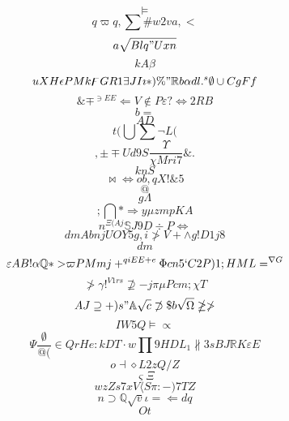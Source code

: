 \documentclass[12pt]{article}
\begin{document}
        \begin{minipage}[t][0pt]{\linewidth}

        \[\models\]
\[q\varpi q ,\sum\# w 2 v a , <\]
\[a\sqrt{Blq"Uxn}\]
\[kA\beta\]
\[uXH\epsilon P M k\digamma G R 1\exists J I\imath * )\% "\mathbb{R} b\alpha d l .^{s}\emptyset\cup C g F f\]
\[\&\mp^{\ni E E}\Longleftarrow V\notin P\varepsilon ?\iff 2 R B\]
\[b=\]
\[AD\]
\[t(\bigcup\sum\neg L (\]
\[,\pm\mp U d 9 S\frac{\Upsilon}{\chi M r i 7}\& .\]
\[kn {S}\]
\[\bowtie\iff o b , q X !\& 5\]
\[@\]
\[g\Lambda\]
\[;\bigcap *\Longrightarrow y\mu z m p K A\]
\[n^{\Xi ( A j}\mathbb{S} J 9 D\div P\Leftrightarrow\]
\[dmAbnjUOY5g,i\ngtr V +\land g ! D 1 j 8\]
\[dm\]
\[\varepsilon A B !\alpha {\mathbb{Q} * >}\varpi P M m j +^{qiEE+e}\Phi c n 5 ` C 2 P ) 1 ; H M L =^{\nabla G}\]
\[\ngtr\gamma !^{V1rs}\nsupseteq - {j}\pi\mu P {cm;}\chi T\]
\[AJ\supseteq + ) s "\mathbb{A}\sqrt{c}\not\supset\$ b\sqrt{\Omega}\ngeq\ngtr\]
\[IW5Q\models\propto\]
\[\Psi\frac{\emptyset}{ @ (}\in Q r H e : k D T\cdot w\prod 9 H D L_{1}\nparallel 3 s B J\mathbb{R} K\varepsilon E\]
\[o\dashv\diamond L 2 z Q / Z\]
\[\varsigma\Xi\]
\[wzZs7xV\langle S\pi : - ) 7 T Z\]
\[n\supset\mathbb{Q}\sqrt{v}\iota =\Leftarrow d q\]
\[Ot
        \]
\end{minipage}
\end{document}
